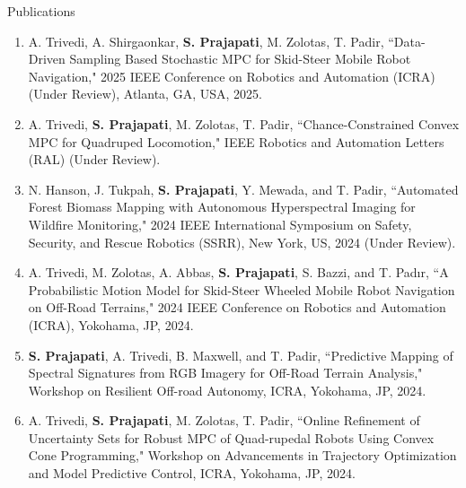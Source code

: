 \documentclass{resume}
\begin{document}
\begin{rSection}{Publications}
\begin{enumerate}[leftmargin=0.5cm]
    \item A. Trivedi, A. Shirgaonkar, \textbf{S. Prajapati}, M. Zolotas, T. Padir, ``Data-Driven Sampling Based Stochastic MPC for Skid-Steer Mobile
Robot Navigation," 2025 IEEE Conference on Robotics and Automation (ICRA) (Under Review), Atlanta, GA, USA, 2025.
    \item A. Trivedi, \textbf{S. Prajapati}, M. Zolotas, T. Padir, ``Chance-Constrained Convex MPC for Quadruped Locomotion," IEEE Robotics and Automation Letters (RAL) (Under Review).
    \item N. Hanson, J. Tukpah, \textbf{S. Prajapati}, Y. Mewada, and T. Padir, ``Automated Forest Biomass Mapping with Autonomous Hyperspectral
Imaging for Wildfire Monitoring," 2024 IEEE International Symposium on Safety, Security, and Rescue Robotics (SSRR), New York, US, 2024 (Under Review).
    \item A. Trivedi, M. Zolotas, A. Abbas, \textbf{S. Prajapati}, S. Bazzi, and T. Padır, ``A Probabilistic Motion Model for Skid-Steer Wheeled Mobile Robot Navigation on Off-Road Terrains," 2024 IEEE Conference on Robotics and Automation (ICRA), Yokohama, JP, 2024.
    \item \vspace{-0.3em} \textbf{S. Prajapati}, A. Trivedi, B. Maxwell, and T. Padir, ``Predictive Mapping of Spectral Signatures from RGB Imagery for Off-Road Terrain Analysis," Workshop on Resilient Off-road Autonomy, ICRA, Yokohama, JP, 2024.
    
    \item \vspace{-0.3em} A. Trivedi, \textbf{S. Prajapati}, M. Zolotas, T. Padir, ``Online Refinement of Uncertainty Sets for Robust MPC of Quad-rupedal
    Robots Using Convex Cone Programming," Workshop on Advancements in Trajectory Optimization and Model Predictive Control, ICRA, Yokohama, JP, 2024.
    

\end{enumerate}
\end{rSection}
\end{document}
